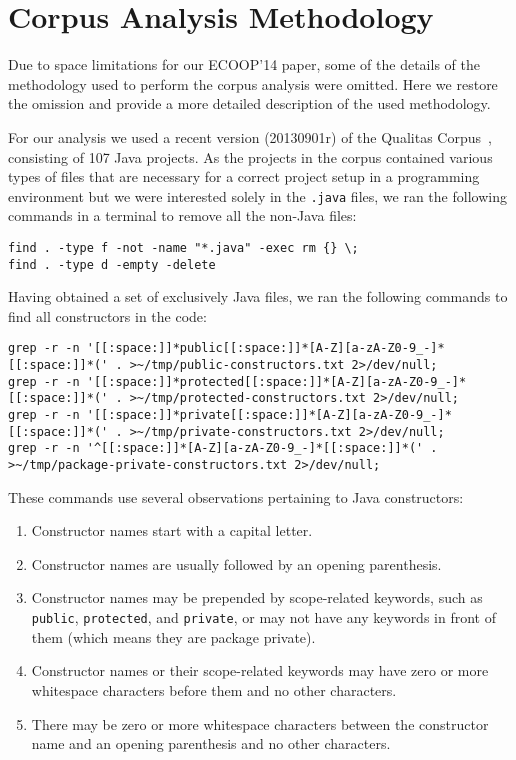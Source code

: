 \section{Corpus Analysis Methodology}

Due to space limitations for our ECOOP'14 paper, some of the details of the methodology used to perform the corpus analysis were omitted. Here we restore the omission and provide a more detailed description of the used methodology.

For our analysis we used a recent version (20130901r) of the Qualitas Corpus~\cite{QualitasCorpus:APSEC:2010}, consisting of 107 Java projects. As the projects in the corpus contained various types of files that are necessary for a correct project setup in a programming environment but we were interested solely in the \lstinline{.java} files, we ran the following commands in a terminal to remove all the non-Java files:

\begin{lstlisting}
find . -type f -not -name "*.java" -exec rm {} \;
find . -type d -empty -delete
\end{lstlisting}

Having obtained a set of exclusively Java files, we ran the following commands to find all constructors in the code:

\begin{lstlisting}
grep -r -n '[[:space:]]*public[[:space:]]*[A-Z][a-zA-Z0-9_-]*[[:space:]]*(' . >~/tmp/public-constructors.txt 2>/dev/null;
grep -r -n '[[:space:]]*protected[[:space:]]*[A-Z][a-zA-Z0-9_-]*[[:space:]]*(' . >~/tmp/protected-constructors.txt 2>/dev/null;
grep -r -n '[[:space:]]*private[[:space:]]*[A-Z][a-zA-Z0-9_-]*[[:space:]]*(' . >~/tmp/private-constructors.txt 2>/dev/null;
grep -r -n '^[[:space:]]*[A-Z][a-zA-Z0-9_-]*[[:space:]]*(' . >~/tmp/package-private-constructors.txt 2>/dev/null;
\end{lstlisting}

These commands use several observations pertaining to Java constructors:

\begin{enumerate}
\item Constructor names start with a capital letter.
\item Constructor names are usually followed by an opening parenthesis.
\item Constructor names may be prepended by scope-related keywords, such as \lstinline{public}, \lstinline{protected}, and \lstinline{private}, or may not have any keywords in front of them (which means they are package private).
\item Constructor names or their scope-related keywords may have zero or more whitespace characters before them and no other characters.
\item There may be zero or more whitespace characters between the constructor name and an opening parenthesis and no other characters.
\end{enumerate}

